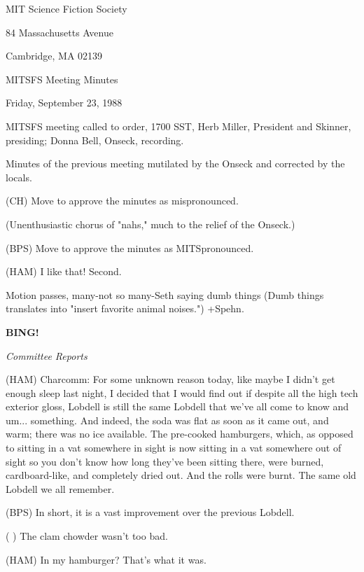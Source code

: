 \documentclass[12pt]{article}
\newcommand{\bing}{{\bf BING!} }
\newcommand{\goto}[1]{\bing \vskip 12pt \centerline{{\em{#1}}}}
\begin{document}
\begin{center}

MIT Science Fiction Society 

84 Massachusetts Avenue

Cambridge, MA 02139

\vspace{12pt}

MITSFS Meeting Minutes 

Friday, September 23, 1988

\end{center}
 
\vspace{18pt}

\setlength{\parskip}{6pt}

\noindent
MITSFS meeting called to order, 1700 SST,
Herb Miller, President and Skinner, presiding; Donna Bell, Onseck, recording.

Minutes of the previous meeting mutilated by the Onseck and corrected by the locals.

(CH) Move to approve the minutes as mispronounced.

(Unenthusiastic chorus of "nahs," much
to the relief of the Onseck.)

(BPS) Move to approve the minutes as MITSpronounced.

(HAM) I like that! Second.

Motion passes, many-not so many-Seth saying dumb things (Dumb things translates into
"insert favorite animal noises.") +Spehn.

\goto{Committee Reports}

(HAM) Charcomm: For some unknown reason today, like maybe I didn't get enough sleep last night, I decided that I would find out if despite all the high tech exterior gloss, Lobdell is still the same Lobdell that we've all come to know and um... something. And indeed, the soda was flat as soon as it came out, and warm; there was no ice available. The pre-cooked hamburgers, which, as opposed to sitting in a vat somewhere in sight is now sitting in a vat somewhere out of sight so you don't know how long they've been sitting there, were burned, cardboard-like, and completely dried out. And the rolls were burnt. The same old Lobdell we all remember.

(BPS) In short, it is a vast improvement over the previous Lobdell.

( ) The clam chowder wasn't too bad.

(HAM) In my hamburger? That's what it was.
\end{document}
